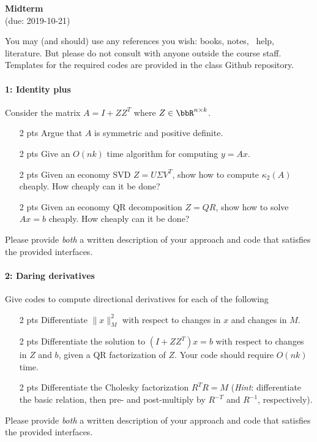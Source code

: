 \documentclass[12pt, leqno]{article} %
\begin{document}
\pagestyle{fancy}
\fancyfoot{}
\begin{center}
  {\large{\bf Midterm}} \\ (due: 2019-10-21)
\end{center}

You may (and should) use any references you wish: books, notes,
\matlab\ help, literature.  But please do not consult with anyone
outside the course staff.  Templates for the required codes are
provided in the class Github repository.

\paragraph*{1: Identity plus}
Consider the matrix $A = I + ZZ^T$ where $Z \in \bbR^{n \times k}$.
\begin{itemize}
\item[2 pts] Argue that $A$ is symmetric and positive definite.
\item[2 pts] Give an $O(nk)$ time algorithm for computing $y = Ax$.
\item[2 pts] Given an economy SVD $Z = U \Sigma V^T$, show how to compute
  $\kappa_2(A)$ cheaply.  How cheaply can it be done?
\item[2 pts] Given an economy QR decomposition $Z = QR$, show how to solve
  $Ax = b$ cheaply.  How cheaply can it be done?
\end{itemize}
Please provide {\em both} a written description of your approach and
code that satisfies the provided interfaces.

\paragraph*{2: Daring derivatives}
Give codes to compute directional derivatives for each of the
following
\begin{itemize}
\item[2 pts] Differentiate $\|x\|_M^2$ with respect to changes in $x$ and
  changes in $M$.
\item[2 pts] Differentiate the solution to $(I+ZZ^T) x = b$ with respect to
  changes in $Z$ and $b$, given a QR factorization of $Z$.  Your code
  should require $O(nk)$ time.
\item[2 pts] Differentiate the Cholesky factorization $R^T R = M$
  ({\em Hint}: differentiate the basic relation, then pre- and
  post-multiply by $R^{-T}$ and $R^{-1}$, respectively).
\end{itemize}
Please provide {\em both} a written description of your approach and
code that satisfies the provided interfaces.
\end{document}
